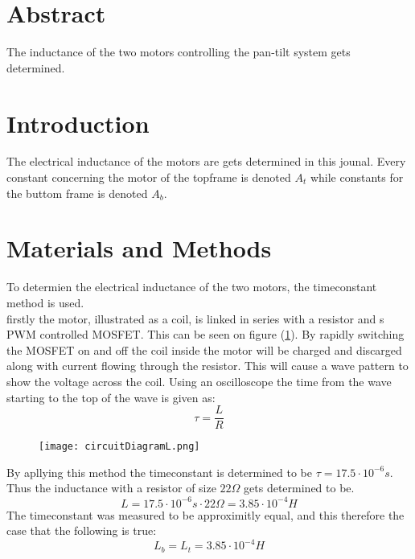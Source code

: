 \documentclass[../main]{subfiles}
\begin{document}
\section{Abstract}
The inductance of the two motors controlling the pan-tilt system gets determined.
\section{Introduction}
The electrical inductance of the motors are gets determined in this jounal. Every constant concerning the motor of the topframe is denoted $A_t$ while constants for the buttom frame is denoted $A_b$.
\section{Materials and Methods}

To determien the electrical inductance of the two motors, the timeconstant method is used.\\
firstly the motor, illustrated as a coil, is linked in series with a resistor and s PWM controlled MOSFET. This can be seen on figure (\ref{fig:inductance_circuit}). By rapidly switching the MOSFET on and off the coil inside the motor will be charged and discarged along with current flowing through the resistor. This will cause a wave pattern to show the voltage across the coil. Using an oscilloscope the time from the wave starting to the top of the wave is given as:
$$\tau = \frac{L}{R}$$

\begin{figure}[h]
  \label{fig:inductance_circuit}
  \begin{center}
    \texttt{[image: circuitDiagramL.png]}
  \end{center}
\end{figure}



\newpage

By apllying this method the timeconstant is determined to be $\tau = 17.5 \cdot 10^{-6}s$. Thus the inductance with a resistor of size $22\Omega$ gets determined to be.\\
$$L = 17.5 \cdot 10^{-6}s \cdot 22 \Omega = 3.85 \cdot 10^{-4}H$$
The timeconstant was measured to be approximitly equal, and this therefore the case that the following is true:\\
$$L_b=L_t=3.85 \cdot 10^{-4}H$$
\end{document}
